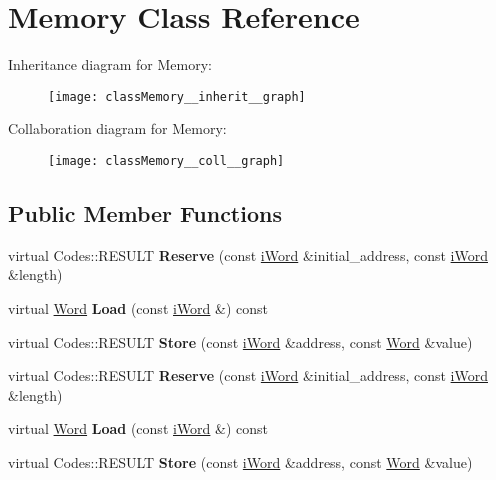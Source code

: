 \hypertarget{classMemory}{
\section{Memory Class Reference}
\label{classMemory}
}


Inheritance diagram for Memory:\nopagebreak
\begin{figure}[H]
\begin{center}
\leavevmode
\texttt{[image: classMemory\_\_inherit\_\_graph]}
\end{center}
\end{figure}


Collaboration diagram for Memory:\nopagebreak
\begin{figure}[H]
\begin{center}
\leavevmode
\texttt{[image: classMemory\_\_coll\_\_graph]}
\end{center}
\end{figure}
\subsection*{Public Member Functions}
\begin{DoxyCompactItemize}
\item 
\hypertarget{classMemory_a80cd994d4833dde66b8005184e510dda}{
virtual Codes::RESULT {\bfseries Reserve} (const \hyperlink{classiWord}{iWord} \&initial\_\-address, const \hyperlink{classiWord}{iWord} \&length)}
\label{classMemory_a80cd994d4833dde66b8005184e510dda}

\item 
\hypertarget{classMemory_aca021609915080b38ca1b00d9b416e80}{
virtual \hyperlink{classWord}{Word} {\bfseries Load} (const \hyperlink{classiWord}{iWord} \&) const }
\label{classMemory_aca021609915080b38ca1b00d9b416e80}

\item 
\hypertarget{classMemory_a23703464fb24710d09be1b2010e79edc}{
virtual Codes::RESULT {\bfseries Store} (const \hyperlink{classiWord}{iWord} \&address, const \hyperlink{classWord}{Word} \&value)}
\label{classMemory_a23703464fb24710d09be1b2010e79edc}

\item 
\hypertarget{classMemory_afe683401c1656b0a077d5f666f9c8d51}{
virtual Codes::RESULT {\bfseries Reserve} (const \hyperlink{classiWord}{iWord} \&initial\_\-address, const \hyperlink{classiWord}{iWord} \&length)}
\label{classMemory_afe683401c1656b0a077d5f666f9c8d51}

\item 
\hypertarget{classMemory_af043b481b061644f9ff6cd7288655c93}{
virtual \hyperlink{classWord}{Word} {\bfseries Load} (const \hyperlink{classiWord}{iWord} \&) const }
\label{classMemory_af043b481b061644f9ff6cd7288655c93}

\item 
\hypertarget{classMemory_a100745221ade9b322743514d91fcce23}{
virtual Codes::RESULT {\bfseries Store} (const \hyperlink{classiWord}{iWord} \&address, const \hyperlink{classWord}{Word} \&value)}
\label{classMemory_a100745221ade9b322743514d91fcce23}

\end{DoxyCompactItemize}
